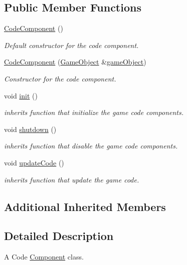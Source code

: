 \subsection*{Public Member Functions}
\begin{DoxyCompactItemize}
\item 
\hyperlink{classengine_1_1_code_component_a7dada09414813e7a5f83679323402dd3}{Code\+Component} ()
\begin{DoxyCompactList}\small\item\em Default constructor for the code component. \end{DoxyCompactList}\item 
\hyperlink{classengine_1_1_code_component_aa48bca8c3008c5d51e5131dde228deb3}{Code\+Component} (\hyperlink{classengine_1_1_game_object}{Game\+Object} \&\hyperlink{classengine_1_1_component_ad4a4865ca4df98ebea34d04a4ec5ad07}{game\+Object})
\begin{DoxyCompactList}\small\item\em Constructor for the code component. \end{DoxyCompactList}\item 
void \hyperlink{classengine_1_1_code_component_a710d9f79114c7b055aaa94fae179ae55}{init} ()
\begin{DoxyCompactList}\small\item\em inherits function that initialize the game code components. \end{DoxyCompactList}\item 
void \hyperlink{classengine_1_1_code_component_af76ba17f9f87216418081d1e2c7c3a22}{shutdown} ()
\begin{DoxyCompactList}\small\item\em inherits function that disable the game code components. \end{DoxyCompactList}\item 
void \hyperlink{classengine_1_1_code_component_a78363275025956ccdbfa11fd42f8ae96}{update\+Code} ()
\begin{DoxyCompactList}\small\item\em inherits function that update the game code. \end{DoxyCompactList}\end{DoxyCompactItemize}
\subsection*{Additional Inherited Members}


\subsection{Detailed Description}
A Code \hyperlink{classengine_1_1_component}{Component} class. 

